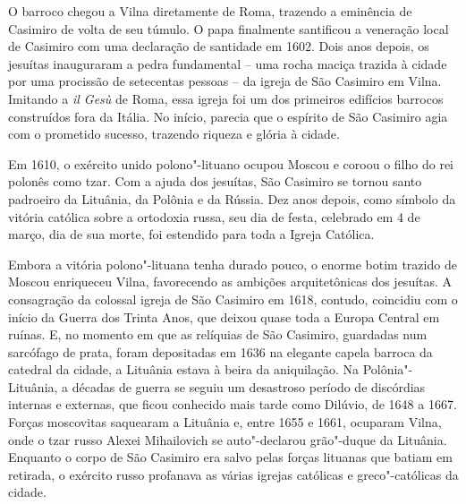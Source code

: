 \asterisc

O barroco chegou a Vilna diretamente de Roma, trazendo a eminência de
Casimiro de volta de seu túmulo. O papa finalmente santificou a
veneração local de Casimiro com uma declaração de santidade em 1602.
Dois anos depois, os jesuítas inauguraram a pedra fundamental -- uma
rocha maciça trazida à cidade por uma procissão de setecentas pessoas --
da igreja de São Casimiro em Vilna. Imitando a \textit{il Gesù} de Roma,
essa igreja foi um dos primeiros edifícios barrocos construídos fora da
Itália. No início, parecia que o espírito de São Casimiro agia com o
prometido sucesso, trazendo riqueza e glória à cidade. 


Em 1610, o exército unido polono"-lituano ocupou Moscou e coroou o filho do rei
polonês como tzar. Com a ajuda dos jesuítas, São Casimiro se tornou
santo padroeiro da Lituânia, da Polônia e da Rússia. Dez anos depois,
como símbolo da vitória católica sobre a ortodoxia russa, seu dia de
festa, celebrado em 4 de março, dia de sua morte, foi estendido para
toda a Igreja Católica.

Embora a vitória polono"-lituana tenha durado pouco, o enorme botim
trazido de Moscou enriqueceu Vilna, favorecendo as ambições
arquitetônicas dos jesuítas. A consagração da colossal igreja de São
Casimiro em 1618, contudo, coincidiu com o início da Guerra dos Trinta
Anos, que deixou quase toda a Europa Central em ruínas. E, no momento em
que as relíquias de São Casimiro, guardadas num sarcófago de prata,
foram depositadas em 1636 na elegante capela barroca da catedral da
cidade, a Lituânia estava à beira da aniquilação. Na Polônia"-Lituânia, a
décadas de guerra se seguiu um desastroso período de discórdias internas
e externas, que ficou conhecido mais tarde como Dilúvio, de 1648 a 1667.
Forças moscovitas saquearam a Lituânia e, entre 1655 e 1661, ocuparam
Vilna, onde o tzar russo Alexei Mihailovich se auto"-declarou grão"-duque
da Lituânia. Enquanto o corpo de São Casimiro era salvo pelas forças
lituanas que batiam em retirada, o exército russo profanava as várias
igrejas católicas e greco"-católicas da cidade.

